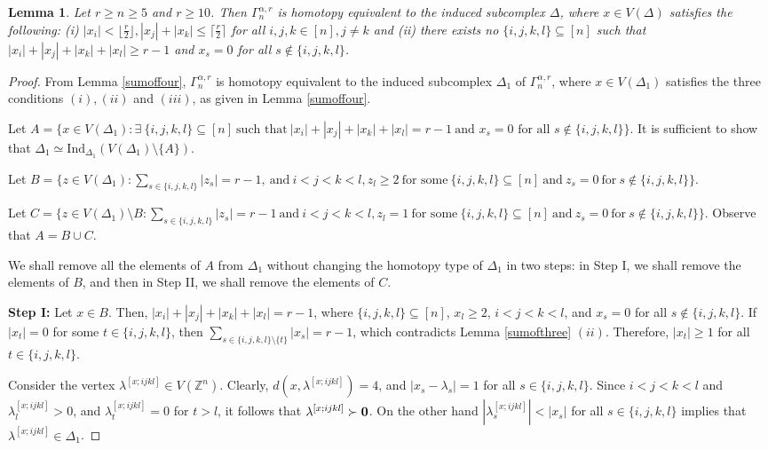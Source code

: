 \documentclass{amsart}
\newtheorem{lemma}[theorem]{Lemma}
\theoremstyle{definition}
\theoremstyle{remark}
\numberwithin{equation}{section}
\newcommand{\D}{\Delta}
\newcommand{\f}{\lfloor\frac{r}{2}\rfloor}
\newcommand{\cil}{\lceil\frac{r}{2}\rceil}
\def\Z{{\mathbb{Z}}}
\begin{document}
\begin{lemma}\label{sumoffour2}
	Let $r \geq n \geq 5$ and  $r\geq 10$. Then $\Gamma_n^{\alpha, r}$ is homotopy equivalent to the induced subcomplex $\Delta$, where $x \in V(\Delta)$ satisfies the following:
	(i) $|x_i|< \f, |x_j|+|x_k|\leq \cil$ for all $i, j, k \in [n], j \neq k$ and (ii) there exists no $\{i, j, k , l\}\subseteq [n]$ such that $|x_i|+ |x_j|+ |x_k| + |x_l| \geq  r-1$ and $x_s=0$ for all $s\notin\{i,j,k,l\}$.
	
	
	
	
\end{lemma} 

\begin{proof}
	From Lemma \ref{sumoffour},  $\Gamma_n^{\alpha, r}$ is homotopy equivalent to the induced subcomplex $\Delta_1$ of $\Gamma_n^{\alpha, r}$, where $x \in V(\Delta_1)$ satisfies the three conditions $(i), (ii)$ and $(iii)$, as given in Lemma \ref{sumoffour}. 
	
	Let $A = \{x \in V(\Delta_1) : \exists \ \{i, j, k, l\} \subseteq [n] \ \text{such that} \  |x_i|+ |x_j|+ |x_k| + |x_l| = r-1 \ \text{and }  x_s = 0  \text{ for all }  s \notin\{i,j,k,l\} \}$. It is sufficient to show that $\D_1\simeq \mathrm{Ind}_{\D_1}(V(\D_1)\setminus \{A\})$. 
	
 Let $B=\{z\in V(\D_1): \sum_{s\in\{i,j,k,l\}}|z_s|=r-1, \ \text{and} \ i<j<k<l, z_l\geq2\ \text{for some} \ \{i,j,k,l\}\subseteq[n] 
	\ \text{and} \  z_s=0 \ \text{for}\ s\notin\{i,j,k,l\} \}$. 
	
	Let $C=\{z\in V(\D_1)\setminus B: \sum_{s\in\{i,j,k,l\}}|z_s|=r-1 \ \text{and}\  i<j<k<l, z_l=1\ \text{for some} \ \{i,j,k,l\}\subseteq[n] 
	\ \text{and} \  z_s=0 \ \text{for}\ s\notin\{i,j,k,l\} \}$.
	Observe that $A=B\cup C$.
	
	We shall remove all the elements of $A$ from $\D_1$ without changing the homotopy type of $\D_1$ in two steps: in Step I, we shall remove the elements of $B$, and then in Step II, we shall remove the elements of $C$.
	
    \smallskip
	\noindent 
	\textbf{Step I:}
	Let $x\in B$. Then, $|x_i|+|x_j|+|x_k|+|x_l|=r-1$, where $\{i,j,k,l\}\subseteq [n]$, $x_l\geq 2$, $i<j<k<l$, and $x_s=0$ for all $s\notin \{i,j,k,l\}$. If $|x_t|=0$ for some $t\in \{i,j,k,l\}$, then $\sum_{s\in\{i,j,k,l\}\setminus\{t\}}|x_s|=r-1$, which contradicts Lemma \ref{sumofthree} $(ii)$. Therefore, $|x_t|\geq 1$ for all $t\in \{i,j,k,l\}$.  
	
	Consider the vertex $\lambda^{[x;ijkl]}\in V(\Z^n)$. Clearly,  $d(x,\lambda^{[x;ijkl]})=4$, and $|x_s-\lambda_s|=1$ for all $s\in\{i,j,k,l\}$. Since $i<j<k<l$ and $\lambda^{[x;ijkl]}_l>0$, and $\lambda^{[x;ijkl]}_t=0$ for $t>l$, it follows that $\lambda^{[x;ijkl]}\succ {\bf{0}}$. On the other hand $|\lambda^{[x;ijkl]}_s|<|x_s|$ for all $s\in \{i,j,k,l\}$ implies that $\lambda^{[x;ijkl]}\in \D_1$. 
	

\end{proof}
\end{document}
